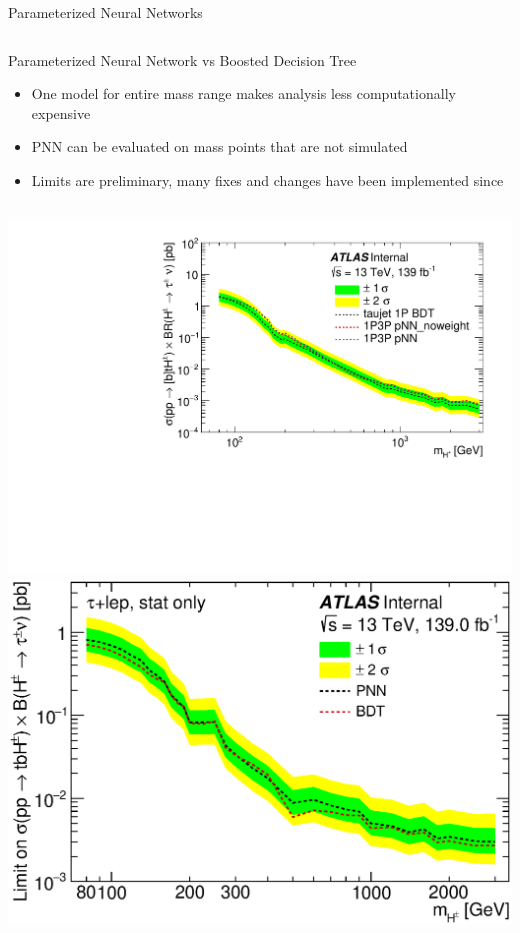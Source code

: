 \documentclass[aspectratio=169,xcolor=table]{beamer}
\begin{document}
\begin{frame}[t]{Parameterized Neural Networks}
\begin{columns}
      \end{columns}
    \end{frame}

    \begin{frame}[t]{Parameterized Neural Network vs Boosted Decision Tree}
      \begin{itemize}
        \item One model for entire mass range makes analysis less computationally expensive
        \item PNN can be evaluated on mass points that are not simulated
        \item Limits are preliminary, many fixes and changes have been implemented since
      \end{itemize}
      \begin{columns}
      \centering
      \includegraphics[width=\textwidth,keepaspectratio=true]{Limits/exp_limit_log_taujet.pdf}
      \centering
      \includegraphics[width=\textwidth,keepaspectratio=true]{Limits/Exp_Limit_log_taulep.eps}
      \end{columns}
    \end{frame}
\end{document}
